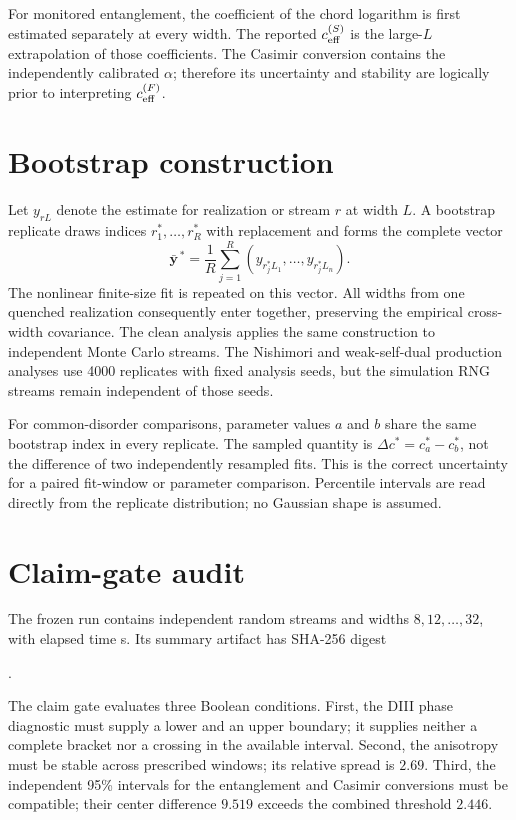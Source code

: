 \documentclass[aps,prb,reprint,superscriptaddress,longbibliography,floatfix]{revtex4-2}
\begin{document}
For monitored entanglement, the coefficient of the chord logarithm is first
estimated separately at every width.  The reported
$c_{\rm eff}^{(S)}$ is the large-$L$ extrapolation of those coefficients.
The Casimir conversion contains the independently calibrated $\alpha$;
therefore its uncertainty and stability are logically prior to interpreting
$c_{\rm eff}^{(F)}$.

\section{Bootstrap construction}
\label{app:bootstrap}

Let $y_{rL}$ denote the estimate for realization or stream $r$ at width $L$.
A bootstrap replicate draws indices
$r_1^\ast,\ldots,r_R^\ast$ with replacement and forms the complete vector
\begin{equation}
 \bm{\bar y}^{\,\ast}
 =\frac{1}{R}\sum_{j=1}^{R}
 (y_{r_j^\ast L_1},\ldots,y_{r_j^\ast L_n}).
\end{equation}
The nonlinear finite-size fit is repeated on this vector.  All widths from one
quenched realization consequently enter together, preserving the empirical
cross-width covariance.  The clean analysis applies the same construction to
independent Monte Carlo streams.  The Nishimori and weak-self-dual production
analyses use 4000 replicates with fixed analysis seeds, but the simulation RNG
streams remain independent of those seeds.

For common-disorder comparisons, parameter values $a$ and $b$ share the same
bootstrap index in every replicate.  The sampled quantity is
$\Delta c^\ast=c_a^\ast-c_b^\ast$, not the difference of two independently
resampled fits.  This is the correct uncertainty for a paired fit-window or
parameter comparison.  Percentile intervals are read directly from the
replicate distribution; no Gaussian shape is assumed.

\section{Claim-gate audit}
\label{app:gates}

The frozen run contains \LearningTasks{} independent random streams and widths
$8,12,\ldots,32$, with elapsed time \LearningRuntime{} s.  Its summary artifact
has SHA-256 digest
\begin{widetext}
\begin{center}
\texttt{\LearningSummaryHash}.
\end{center}
\end{widetext}
The claim gate evaluates three Boolean conditions.  First, the DIII phase
diagnostic must supply a lower and an upper boundary; it supplies neither a
complete bracket nor a crossing in the available interval.  Second, the
anisotropy must be stable across prescribed windows; its relative spread is
$2.69$.  Third, the independent 95\% intervals for the entanglement and
Casimir conversions must be compatible; their center difference $9.519$
exceeds the combined threshold $2.446$.
\end{document}
